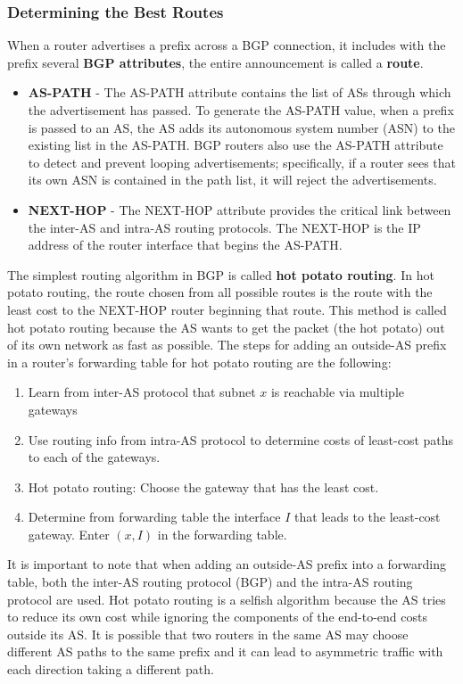 \subsubsection{Determining the Best Routes}
When a router advertises a prefix across a BGP connection, it includes with the prefix several \textbf{BGP attributes}, the entire announcement is called a \textbf{route}.
\begin{itemize}
\item \textbf{AS-PATH} - The AS-PATH attribute contains the list of ASs through which the advertisement has passed. To generate the AS-PATH value, when a prefix is passed to an AS, the AS adds its autonomous system number (ASN) to the existing list in the AS-PATH. BGP routers also use the AS-PATH attribute to detect and prevent looping advertisements; specifically, if a router sees that its own ASN is contained in the path list, it will reject the advertisements.
\item \textbf{NEXT-HOP} - The NEXT-HOP attribute provides the critical link between the inter-AS and intra-AS routing protocols. The NEXT-HOP is the IP address of the router interface that begins the AS-PATH. 
\end{itemize}
The simplest routing algorithm in BGP is called \textbf{hot potato routing}. In hot potato routing, the route chosen from all possible routes is the route with the least cost to the NEXT-HOP router beginning that route. This method is called hot potato routing because the AS wants to get the packet (the hot potato) out of its own network as fast as possible. The steps for adding an outside-AS prefix in a router's forwarding table for hot potato routing are the following:
\begin{enumerate}
\item Learn from inter-AS protocol that subnet $x$ is reachable via multiple gateways
\item Use routing info from intra-AS protocol to determine costs of least-cost paths to each of the gateways.
\item Hot potato routing: Choose the gateway that has the least cost.
\item Determine from forwarding table the interface $I$ that leads to the least-cost gateway. Enter $(x, I)$ in the forwarding table.
\end{enumerate}
It is important to note that when adding an outside-AS prefix into a forwarding table, both the inter-AS routing protocol (BGP) and the intra-AS routing protocol are used. Hot potato routing is a selfish algorithm because the AS tries to reduce its own cost while ignoring the components of the end-to-end costs outside its AS. It is possible that two routers in the same AS may choose different AS paths to the same prefix and it can lead to asymmetric traffic with each direction taking a different path.\vspace{.3cm}\\
